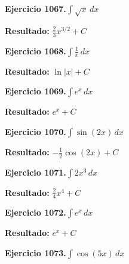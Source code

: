 \documentclass[10pt,a4paper]{article}
\begin{document}
\begin{ejbox}
\textbf{Ejercicio 1067.}\quad $\int \sqrt{x}\,dx$
\end{ejbox}

\begin{solbox}
\textbf{Resultado:} \(\displaystyle \frac{2}{3}x^{3/2} + C\)
\end{solbox}

\begin{ejbox}
\textbf{Ejercicio 1068.}\quad $\int \frac{1}{x}\,dx$
\end{ejbox}

\begin{solbox}
\textbf{Resultado:} \(\displaystyle \ln|x| + C\)
\end{solbox}

\newpage
\begin{ejbox}
\textbf{Ejercicio 1069.}\quad $\int e^x\,dx$
\end{ejbox}

\begin{solbox}
\textbf{Resultado:} \(\displaystyle e^x + C\)
\end{solbox}

\begin{ejbox}
\textbf{Ejercicio 1070.}\quad $\int \sin(2x)\,dx$
\end{ejbox}

\begin{solbox}
\textbf{Resultado:} \(\displaystyle -\frac{1}{2}\cos(2x) + C\)
\end{solbox}

\begin{ejbox}
\textbf{Ejercicio 1071.}\quad $\int 2x^{3}\,dx$
\end{ejbox}

\begin{solbox}
\textbf{Resultado:} \(\displaystyle \frac{2}{4}x^{4} + C\)
\end{solbox}

\newpage
\begin{ejbox}
\textbf{Ejercicio 1072.}\quad $\int e^x\,dx$
\end{ejbox}

\begin{solbox}
\textbf{Resultado:} \(\displaystyle e^x + C\)
\end{solbox}

\begin{ejbox}
\textbf{Ejercicio 1073.}\quad $\int \cos(5x)\,dx$
\end{ejbox}
\end{document}
